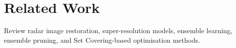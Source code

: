 \section{Related Work}
Review radar image restoration, super-resolution models, ensemble learning, ensemble pruning, and Set Covering-based optimisation methods.
